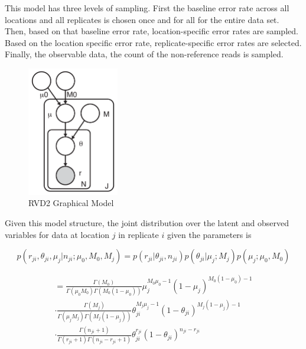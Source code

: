 \documentclass[11pt,reqno]{amsart}
\begin{document}
This model has three levels of sampling. First the baseline error rate across all locations and all replicates is chosen once and for all for the entire data set. Then, based on that baseline error rate, location-specific error rates are sampled. Based on the location specific error rate, replicate-specific error rates are selected. Finally, the observable data, the count of the non-reference reads is sampled.

\begin{figure}[h]
\begin{center}
\includegraphics[width=40mm]{pdf_figs/RVD2_model.pdf}
\caption{RVD2 Graphical Model}
\label{fig:graphical_model}
\end{center}
\end{figure}


Given this model structure, the joint distribution over the latent and observed variables for data at location $j$ in replicate $i$ given the parameters is

\begin{equation}\label{eqn:jointpdf}
p \left( r_{ji}, \theta_{ji}, \mu_j | n_{ji}; \mu_0, M_0, M_j \right) = p \left( r_{ji} | \theta_{ji}, n_{ji} \right) p\left( \theta_{ji} | \mu_j; M_j \right) p\left( \mu_j; \mu_0, M_0 \right)
\end{equation}

\begin{gather}
= \frac{ \Gamma(M_0) } { \Gamma(\mu_0 M_0) \Gamma(M_0 (1-\mu_0)) } \mu_j^{M_0\mu_0 -1} (1 - \mu_j)^{M_0 ( 1 - \mu_0) - 1} \\
\cdot \frac{ \Gamma(M_j) } { \Gamma(\mu_j M_j) \Gamma(M_j (1-\mu_j)) } \theta_{ji}^{M_j\mu_j -1} (1 - \theta_{ji})^{M_j ( 1 - \mu_j) - 1} \\
\cdot \frac{ \Gamma(n_{ji}+1) } { \Gamma(r_{ji}+1) \Gamma( n_{ji} - r_{ji} + 1 ) } \theta_{ji}^{r_{ji}} (1 - \theta_{ji})^{n_{ji} - r_{ji}}
\end{gather}
\end{document}
